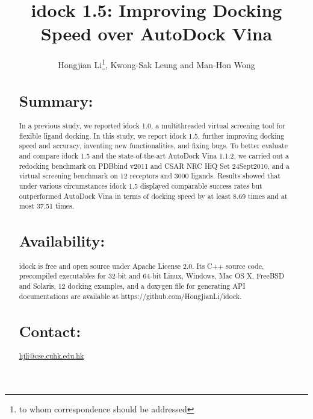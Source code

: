 \documentclass{bioinfo}
\begin{document}

\title[idock 1.5]{idock 1.5: Improving Docking Speed over AutoDock Vina}
\author[Hongjian Li \textit{et~al}]{Hongjian Li\footnote{to whom correspondence should be addressed}, Kwong-Sak Leung and Man-Hon Wong}
\address{Department of Computer Science and Engineering, Chinese University of Hong Kong, Shatin, New Territories, Hong Kong, China}



\maketitle

\begin{abstract}
\section{Summary:}
In a previous study, we reported idock 1.0, a multithreaded virtual screening tool for flexible ligand docking. In this study, we report idock 1.5, further improving docking speed and accuracy, inventing new functionalities, and fixing bugs. To better evaluate and compare idock 1.5 and the state-of-the-art AutoDock Vina 1.1.2, we carried out a redocking benchmark on PDBbind v2011 and CSAR NRC HiQ Set 24Sept2010, and a virtual screening benchmark on 12 receptors and 3000 ligands. Results showed that under various circumstances idock 1.5 displayed comparable success rates but outperformed AutoDock Vina in terms of docking speed by at least 8.69 times and at most 37.51 times.

\section{Availability:}
idock is free and open source under Apache License 2.0. Its C++ source code, precompiled executables for 32-bit and 64-bit Linux, Windows, Mac OS X, FreeBSD and Solaris, 12 docking examples, and a doxygen file for generating API documentations are available at https://github.com/HongjianLi/idock.

\section{Contact:} \href{hjli@cse.cuhk.edu.hk}{hjli@cse.cuhk.edu.hk}
\end{abstract}
\end{document}

